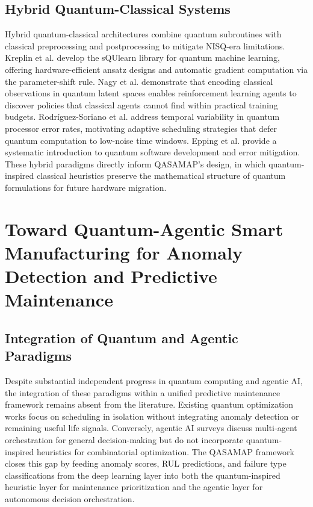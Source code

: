\subsection{Hybrid Quantum-Classical Systems}

Hybrid quantum-classical architectures combine quantum subroutines with classical preprocessing and postprocessing to mitigate NISQ-era limitations. Kreplin et al. \cite{kreplin_squlearn_2025} develop the sQUlearn library for quantum machine learning, offering hardware-efficient ansatz designs and automatic gradient computation via the parameter-shift rule. Nagy et al. \cite{nagy_hybrid_2025} demonstrate that encoding classical observations in quantum latent spaces enables reinforcement learning agents to discover policies that classical agents cannot find within practical training budgets. Rodr\'iguez-Soriano et al. \cite{rodriguez-soriano_predicting_2025} address temporal variability in quantum processor error rates, motivating adaptive scheduling strategies that defer quantum computation to low-noise time windows. Epping et al. \cite{Epping2025} provide a systematic introduction to quantum software development and error mitigation. These hybrid paradigms directly inform QASAMAP's design, in which quantum-inspired classical heuristics preserve the mathematical structure of quantum formulations for future hardware migration.

\section{Toward Quantum-Agentic Smart Manufacturing for Anomaly Detection and Predictive Maintenance}



\subsection{Integration of Quantum and Agentic Paradigms}

Despite substantial independent progress in quantum computing and agentic AI, the integration of these paradigms within a unified predictive maintenance framework remains absent from the literature. Existing quantum optimization works \cite{rosendo_quantum_2025, holliday_advanced_2025} focus on scheduling in isolation without integrating anomaly detection or remaining useful life signals. Conversely, agentic AI surveys \cite{sapkota_ai_2026, AbouAli2026} discuss multi-agent orchestration for general decision-making but do not incorporate quantum-inspired heuristics for combinatorial optimization. The QASAMAP framework closes this gap by feeding anomaly scores, RUL predictions, and failure type classifications from the deep learning layer into both the quantum-inspired heuristic layer for maintenance prioritization and the agentic layer for autonomous decision orchestration.

